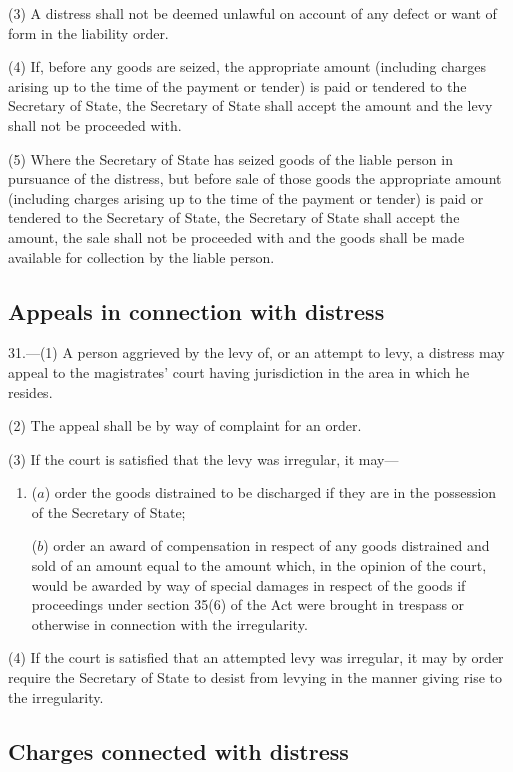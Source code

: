 \documentclass[12pt,a4paper]{article}
\begin{document}
(3) A distress shall not be deemed unlawful on account of any defect or want of form in the liability order.

(4) If, before any goods are seized, the appropriate amount (including charges arising up to the time of the payment or tender) is paid or tendered to the Secretary of State, the Secretary of State shall accept the amount and the levy shall not be proceeded with.

(5) Where the Secretary of State has seized goods of the liable person in pursuance of the distress, but before sale of those goods the appropriate amount (including charges arising up to the time of the payment or tender) is paid or tendered to the Secretary of State, the Secretary of State shall accept the amount, the sale shall not be proceeded with and the goods shall be made available for collection by the liable person.

\subsection[31. Appeals in connection with distress]{Appeals in connection with distress}

31.—(1) A person aggrieved by the levy of, or an attempt to levy, a distress may appeal to the magistrates' court having jurisdiction in the area in which he resides.

(2) The appeal shall be by way of complaint for an order.

(3) If the court is satisfied that the levy was irregular, it may—
\begin{enumerate}\item[]
($a$) order the goods distrained to be discharged if they are in the possession of the Secretary of State;

($b$) order an award of compensation in respect of any goods distrained and sold of an amount equal to the amount which, in the opinion of the court, would be awarded by way of special damages in respect of the goods if proceedings under section 35(6) of the Act were brought in trespass or otherwise in connection with the irregularity.
\end{enumerate}

(4) If the court is satisfied that an attempted levy was irregular, it may by order require the Secretary of State to desist from levying in the manner giving rise to the irregularity.

\subsection[32. Charges connected with distress]{Charges connected with distress}
\end{document}
